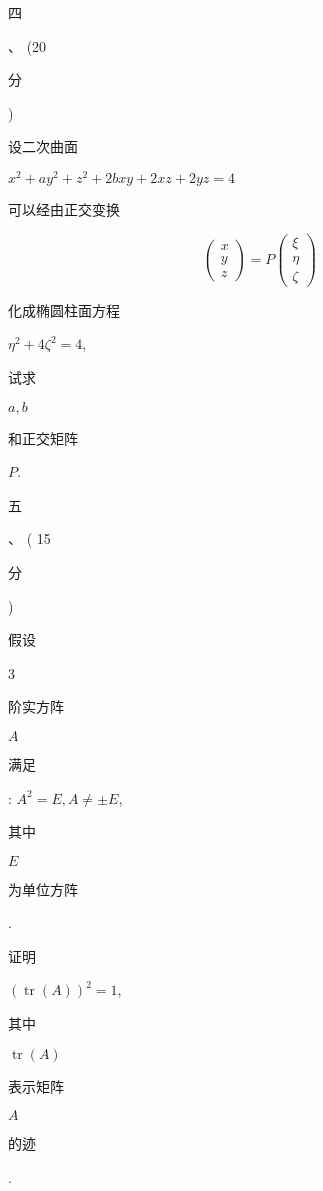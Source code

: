 \documentclass[10pt]{article}
\begin{document}
\begin{CJK}{UTF8}{mj}四\end{CJK}、 (20 \begin{CJK}{UTF8}{mj}分\end{CJK}) \begin{CJK}{UTF8}{mj}设二次曲面\end{CJK} $x^{2}+a y^{2}+z^{2}+2 b x y+2 x z+2 y z=4$ \begin{CJK}{UTF8}{mj}可以经由正交变换\end{CJK}
$$
\left(\begin{array}{l}
x \\
y \\
z
\end{array}\right)=P\left(\begin{array}{l}
\xi \\
\eta \\
\zeta
\end{array}\right)
$$
\begin{CJK}{UTF8}{mj}化成椭圆柱面方程\end{CJK} $\eta^{2}+4 \zeta^{2}=4$, \begin{CJK}{UTF8}{mj}试求\end{CJK} $a, b$ \begin{CJK}{UTF8}{mj}和正交矩阵\end{CJK} $P$.

\begin{CJK}{UTF8}{mj}五\end{CJK}、 ( 15 \begin{CJK}{UTF8}{mj}分\end{CJK}) \begin{CJK}{UTF8}{mj}假设\end{CJK} 3 \begin{CJK}{UTF8}{mj}阶实方阵\end{CJK} $A$ \begin{CJK}{UTF8}{mj}满足\end{CJK}: $A^{2}=E, A \neq \pm E$, \begin{CJK}{UTF8}{mj}其中\end{CJK} $E$ \begin{CJK}{UTF8}{mj}为单位方阵\end{CJK}. \begin{CJK}{UTF8}{mj}证明\end{CJK} $(\operatorname{tr}(A))^{2}=1$, \begin{CJK}{UTF8}{mj}其中\end{CJK} $\operatorname{tr}(A)$ \begin{CJK}{UTF8}{mj}表示矩阵\end{CJK} $A$ \begin{CJK}{UTF8}{mj}的迹\end{CJK}.
\end{document}
